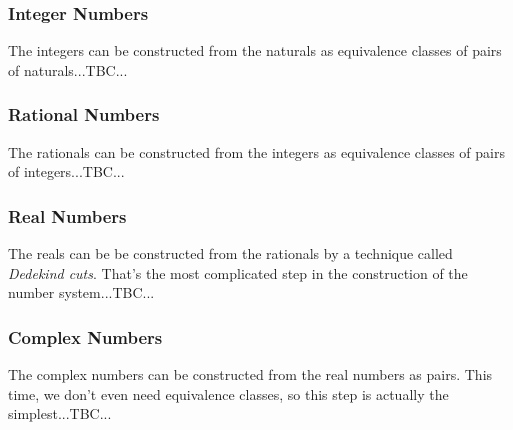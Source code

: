 

\subsubsection{Integer Numbers} The integers can be constructed from the naturals as equivalence classes of pairs of naturals...TBC...

\subsubsection{Rational Numbers} The rationals can be constructed from the integers as equivalence classes of pairs of integers...TBC...

\subsubsection{Real Numbers} The reals can be be constructed from the rationals by a technique called \emph{Dedekind cuts}. That's the most complicated step in the construction of the number system...TBC...

\subsubsection{Complex Numbers} The complex numbers can be constructed from the real numbers as pairs. This time, we don't even need equivalence classes, so this step is actually the simplest...TBC...





